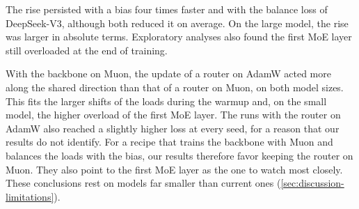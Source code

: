 The rise persisted with a bias four times faster and with the balance loss of DeepSeek-V3, although both reduced it on average. On the large model, the rise was larger in absolute terms. Exploratory analyses also found the first MoE layer still overloaded at the end of training.

With the backbone on Muon, the update of a router on AdamW acted more along the shared direction than that of a router on Muon, on both model sizes. This fits the larger shifts of the loads during the warmup and, on the small model, the higher overload of the first MoE layer. The runs with the router on AdamW also reached a slightly higher loss at every seed, for a reason that our results do not identify. For a recipe that trains the backbone with Muon and balances the loads with the bias, our results therefore favor keeping the router on Muon. They also point to the first MoE layer as the one to watch most closely. These conclusions rest on models far smaller than current ones (\cref{sec:discussion-limitations}).

